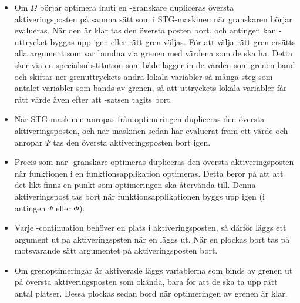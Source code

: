 \documentclass[../Optimise]{subfiles}
\begin{document}
\begin{itemize}
\item
Om $\Omega$ börjar optimera inuti en -granskare dupliceras översta aktiveringsposten 
på samma sätt som i STG-maskinen när granskaren börjar evalueras. När den är klar
tas den översta posten bort, och antingen kan -uttrycket byggas upp igen
eller rätt gren väljas. För att välja rätt gren ersätts alla argument som var
bundna via grenen med värdena som de ska ha. Detta sker via en specialsubstitution 
som både lägger in de värden som grenen band och skiftar ner grenuttryckets andra lokala 
variabler så många steg som antalet variabler som bands av grenen, så att uttryckets
lokala variabler får rätt värde även efter att -satsen tagits bort.

\item
När STG-maskinen anropas från optimeringen dupliceras den översta aktiveringsposten,
och när maskinen sedan har evaluerat fram ett värde och anropar $\Psi$ tas den översta aktiveringsposten bort igen.

\item
Precis som när -granskare optimeras dupliceras den översta aktiveringsposten när
funktionen i en funktionsapplikation optimeras. Detta beror på att att det likt 
finns en punkt som optimeringen ska återvända till. Denna aktiveringspost tas bort när 
funktionsapplikationen byggs upp igen (i antingen $\Psi$ eller $\Phi$). 

\item
Varje -continuation behöver en plats i aktiveringsposten, så därför
läggs ett argument ut på aktiveringspsten när en  läggs ut.
När en  plockas bort tas på motsvarande sätt argumentet på aktiveringsposten bort.

\item
Om grenoptimeringar är aktiverade läggs variablerna som binds av grenen ut på
översta aktiveringsposten som okända, bara för att de ska ta upp rätt antal platser.
Dessa plockas sedan bord när optimeringen av grenen är klar. 


\end{itemize}
\end{document}
